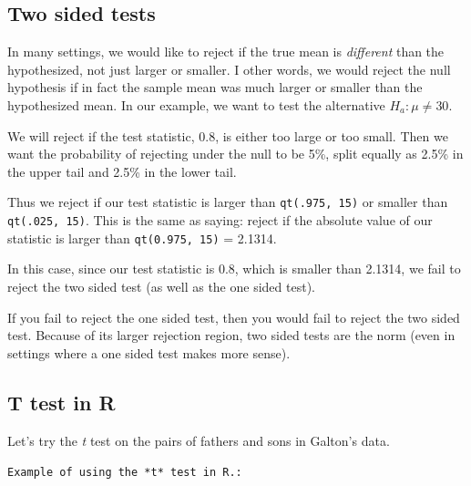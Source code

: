 \documentclass[]{article}
\newenvironment{Shaded}{\begin{snugshade}}{\end{snugshade}}
\newcommand{\KeywordTok}[1]{\textcolor[rgb]{0.13,0.29,0.53}{\textbf{{#1}}}}
\newcommand{\StringTok}[1]{\textcolor[rgb]{0.31,0.60,0.02}{{#1}}}
\newcommand{\NormalTok}[1]{{#1}}
\begin{document}
\subsection{Two sided tests}\label{two-sided-tests}

In many settings, we would like to reject if the true mean is
\emph{different} than the hypothesized, not just larger or smaller. I
other words, we would reject the null hypothesis if in fact the sample
mean was much larger or smaller than the hypothesized mean. In our
example, we want to test the alternative $H_a : \mu \neq 30$.

We will reject if the test statistic, $0.8$, is either too large or too
small. Then we want the probability of rejecting under the null to be
5\%, split equally as 2.5\% in the upper tail and 2.5\% in the lower
tail.

Thus we reject if our test statistic is larger than
\texttt{qt(.975, 15)} or smaller than \texttt{qt(.025, 15)}. This is the
same as saying: reject if the absolute value of our statistic is larger
than \texttt{qt(0.975, 15)} = 2.1314.

In this case, since our test statistic is 0.8, which is smaller than
2.1314, we fail to reject the two sided test (as well as the one sided
test).

If you fail to reject the one sided test, then you would fail to reject
the two sided test. Because of its larger rejection region, two sided
tests are the norm (even in settings where a one sided test makes more
sense).

\subsection{T test in R}\label{t-test-in-r}

Let's try the \emph{t} test on the pairs of fathers and sons in Galton's
data.

\vspace{1pc}

\verb;Example of using the *t* test in R.:;

\begin{Shaded}
\end{Shaded}
\end{document}
